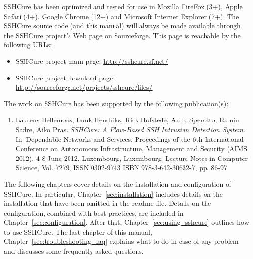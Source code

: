 SSHCure has been optimized and tested for use in Mozilla FireFox (3+), Apple Safari (4+), Google Chrome (12+) and Microsoft Internet Explorer (7+). The SSHCure source code (and this manual) will always be made available through the SSHCure project's Web page on Sourceforge. This page is reachable by the following URLs:

\begin{itemize}
	\item SSHCure project main page: \url{http://sshcure.sf.net/}
	\item SSHCure project download page: \url{http://sourceforge.net/projects/sshcure/files/}
\end{itemize}

The work on SSHCure has been supported by the following publication(s):

\begin{enumerate}
	\item Laurens Hellemons, Luuk Hendriks, Rick Hofstede, Anna Sperotto, Ramin Sadre, Aiko Pras. \textit{SSHCure: A Flow-Based SSH Intrusion Detection System}. In: Dependable Networks and Services. Proceedings of the 6th International Conference on Autonomous Infrastructure, Management and Security (AIMS 2012), 4-8 June 2012, Luxembourg, Luxembourg. Lecture Notes in Computer Science, Vol. 7279, ISSN 0302-9743 ISBN 978-3-642-30632-7, pp. 86-97
\end{enumerate}

The following chapters cover details on the installation and configuration of SSHCure. In particular, Chapter~\ref{sec:installation} includes details on the installation that have been omitted in the readme file. Details on the configuration, combined with best practices, are included in Chapter~\ref{sec:configuration}. After that, Chapter~\ref{sec:using_sshcure} outlines how to use SSHCure. The last chapter of this manual, Chapter~\ref{sec:troubleshooting_faq} explains what to do in case of any problem and discusses some frequently asked questions.
